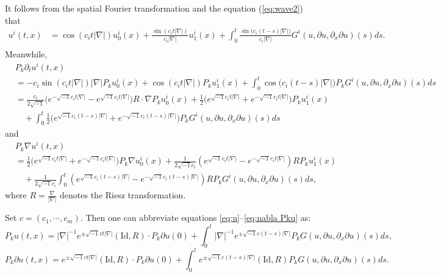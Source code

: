 \documentclass[11pt,twoside]{article}
\def\f{\frac}
\def\p{\partial}
\theoremstyle{plain}
\theoremstyle{definition}
\numberwithin{equation}{section}
\begin{document}
It follows from the spatial Fourier transformation and the equation (\ref{eq:wave2}) that
\begin{equation}\label{eq:u}
	\begin{aligned}
		u^i(t,x) &= \cos(c_it|\nabla|)u^i_0(x) + \frac{\sin(c_it|\nabla|)}{c_i|\nabla|}u^i_1(x) + \int_0^t \frac{\sin\big(c_i(t-s)|\nabla|\big)}{c_i|\nabla|} G^i(u,\p u,\p_x\p u)(s)ds. \\
	\end{aligned}
\end{equation}
Meanwhile,
	\begin{equation}\label{eq:pt Pku}
		\begin{aligned}
			&P_k \partial_tu^i(t,x) \\
			&= -c_i\sin(c_i t|\nabla|)|\nabla| P_ku^i_0(x) + \cos(c_i t|\nabla|) P_k u_1^i(x)
			+ \int_0^t \cos\big(c_i(t-s)|\nabla|\big) P_kG^i(u,\p u,\p_x\p u)(s)ds \\
			&= \frac{c_i}{2\sqrt{-1}}\big(e^{-\sqrt{-1}c_i t|\nabla|} - e^{\sqrt{-1}c_i t|\nabla|}\big) R\cdot\nabla P_k u^i_0(x) + \frac12\big(e^{\sqrt{-1}c_i t|\nabla|} + e^{-\sqrt{-1}c_i t|\nabla|}\big)  P_k u^i_1(x) \\
			&\quad+ \int_0^t \frac12\big(e^{\sqrt{-1}c_i(t-s)|\nabla|} + e^{-\sqrt{-1}c_i(t-s)|\nabla|}\big)P_k G^i(u,\p u,\p_x\p u)(s)ds
		\end{aligned}
	\end{equation}
and
\begin{equation}\label{eq:nabla Pku}
	\begin{aligned}
		&P_k\nabla u^i(t,x) \\
		&= \frac12\big(e^{\sqrt{-1}c_it|\nabla|} + e^{-\sqrt{-1}c_it|\nabla|}\big)  P_k\nabla u^i_0(x) + \frac{1}{2\sqrt{-1}c_i}(e^{\sqrt{-1}c_it|\nabla|} - e^{-\sqrt{-1}c_it|\nabla|})R P_k  u^i_1(x) \\
		 &\quad+ \frac{1}{2\sqrt{-1}c_i}\int_0^t (e^{\sqrt{-1}c_i(t-s)|\nabla|} - e^{-\sqrt{-1}c_i(t-s)|\nabla|}) R P_k G^i(u,\p u,\p_x\p u)(s)ds,
	\end{aligned}
\end{equation}
where $R = \f{\nabla}{|\nabla|}$ denotes the Riesz transformation.

Set $c=(c_1,\cdots,c_m)$.
Then one can abbreviate equations \eqref{eq:u}--\eqref{eq:nabla Pku} as:
\begin{equation}\label{eq:Pku}
P_k u(t,x) = |\nabla|^{-1}e^{\pm \sqrt{-1} ct|\nabla|}(\mathrm{Id},R)\cdot P_k\partial u(0) + \int_0^t  |\nabla|^{-1}e^{\pm \sqrt{-1}c(t-s)|\nabla|}  P_k G(u,\partial u,\p_x\p u)(s)ds,
\end{equation}
\begin{equation}\label{eq:partial Pku}
	P_k \partial u(t,x) = e^{\pm \sqrt{-1} ct|\nabla|}(\mathrm{Id},R)\cdot P_k\partial u(0) + \int_0^t  e^{\pm \sqrt{-1}c(t-s)|\nabla|} (\mathrm{Id},R) P_k G(u,\partial u,\p_x\p u)(s)ds.
\end{equation}
\end{document}
